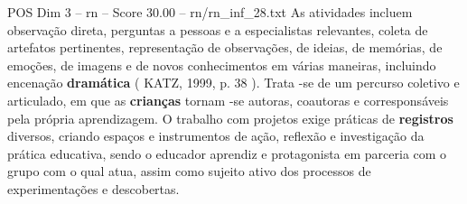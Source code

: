 \begin{textsample}{POS Dim 3 – rn – Score 30.00 – rn/rn\_inf\_28.txt}
As atividades incluem observação direta, perguntas a pessoas e a especialistas relevantes, coleta de artefatos pertinentes, representação de observações, de ideias, de memórias, de emoções, de imagens e de novos conhecimentos em várias maneiras, incluindo encenação \textbf{dramática} ( KATZ, 1999, p. 38 ).
Trata -se de um percurso coletivo e articulado, em que as \textbf{crianças} tornam -se autoras, coautoras e corresponsáveis pela própria aprendizagem.
O trabalho com projetos exige práticas de \textbf{registros} diversos, criando espaços e instrumentos de ação, reflexão e investigação da prática educativa, sendo o educador aprendiz e protagonista em parceria com o grupo com o qual atua, assim como sujeito ativo dos processos de experimentações e descobertas.

\end{textsample}
